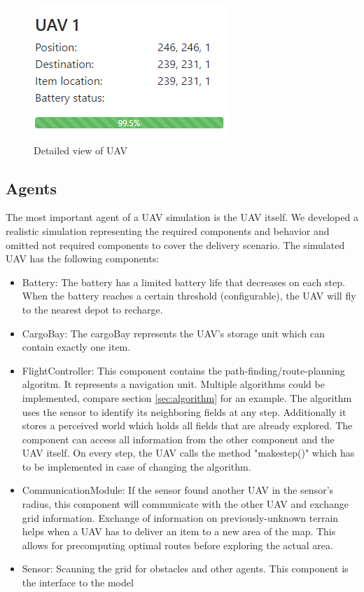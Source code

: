 	\begin{figure}[htbp]\label{fig:uav_detail}
		\centering
		\includegraphics[scale=0.5]{images/uav_detail.png}
		\caption{Detailed view of UAV}
	\end{figure}


\subsection{Agents}\label{sec:UAV}
The most important agent of a UAV simulation is the UAV itself. We developed a realistic simulation representing the required components and behavior and omitted not required components to cover the delivery scenario. The simulated UAV has the following components:
	\begin{itemize}
			\item Battery: The battery has a limited battery life that decreases on each step. When the battery reaches a certain threshold (configurable), the UAV will fly to the nearest depot to recharge.
					\item CargoBay: The cargoBay represents the UAV's storage unit which can contain exactly one item.
		\item FlightController: This component contains the path-finding/route-planning algoritm. It represents a navigation unit. Multiple algorithms could be implemented, compare section \ref{sec:algorithm} for an example. The algorithm uses the sensor to identify its neighboring fields at any step. Additionally it stores a perceived world which holds all fields that are already explored. The component can access all information from the other component and the UAV itself. On every step, the UAV calls the method "make\textunderscore step()" which has to be implemented in case of changing the algorithm.
		\item CommunicationModule: If the sensor found another UAV in the sensor's radius, this component will communicate with the other UAV and exchange grid information. Exchange of information on previously-unknown terrain helps when a UAV has to deliver an item to a new area of the map. This allows for precomputing optimal routes before exploring the actual area.
		\item Sensor: Scanning the grid for obstacles and other agents. This component is the interface to the model
	\end{itemize}

